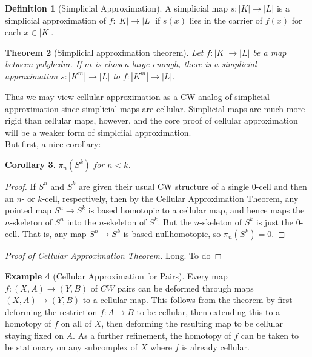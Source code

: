 \documentclass[reqno]{amsart}
\newtheorem{theorem}{Theorem}[section]
\newtheorem{corollary}[theorem]{Corollary}
\theoremstyle{definition}
\newtheorem{definition}[theorem]{Definition}
\newtheorem{example}[theorem]{Example}
\theoremstyle{remark}
\begin{document}
\begin{definition}[Simplicial Approximation]
    A simplicial map $s \colon \left| K \right| 
    \to \left| L \right| $ is a simplicial approximation of 
    $f \colon \left| K \right|  \to \left| L \right| $ 
    if $s(x)$ lies in the carrier of $f(x)$ for
    each $x \in \left| K \right| $.
\end{definition}

\begin{theorem}[Simplicial approximation theorem]
    Let $f \colon \left| K \right| \to 
    \left| L \right| $ be a map between polyhedra.
    If $m$ is chosen large enough, there is a simplicial
    approximation $s \colon \left| K^{m} \right| \to 
    \left| L \right| $ to $f \colon \left| K^{m} \right| 
    \to \left| L \right| $.
\end{theorem}

Thus we may view cellular approximation as
a CW analog of simplicial approximation since simplicial
maps are cellular. Simplicial maps are much more rigid
than cellular maps, however, and the core
proof of cellular approximation will be
a weaker form of simplciial approximation.\\
\linebreak
But first, a nice corollary:

\begin{corollary}
    $\pi_n \left( S^{k} \right) $ for
    $n<k$.
\end{corollary}

\begin{proof}
    If $S^{n}$ and $S^{k}$ are given their usual
    CW structure of a single $0$-cell and
    then an $n$- or $k$-cell, respectively, then by
    the Cellular Approximation Theorem, 
    any pointed map $S^{n} \to S^{k}$ is based homotopic to a 
    cellular map, and hence maps
    the  $n$-skeleton of $S^{n}$ into the $n$-skeleton
    of $S^{k}$. But the $n$-skeleton of $S^{k}$ is
    just the $0$-cell. That is, 
    any map $S^{n} \to S^{k}$ is based nullhomotopic, so
    $\pi_n \left( S^{k} \right) = 0$.
\end{proof}

\begin{proof}[Proof of Cellular Approximation Theorem]
    Long. To do
\end{proof}

\begin{example}[Cellular Approximation for Pairs]
    Every map $f \colon \left( X,A \right) 
    \to \left( Y,B \right) $ of $CW$ pairs can be deformed
    through maps $\left( X,A \right) \to 
    \left( Y,B \right) $ to a cellular map.
    This follows from the theorem by first deforming the
    restriction $f \colon A\to B$ to be cellular,
    then extending this to a homotopy of $f$ on all
    of $X$, then deforming the resulting map
    to be cellular staying fixed on $A$. As a further
    refinement, the homotopy of $f$ can be
    taken to be stationary on any subcomplex of
    $X$ where $f$ is already cellular.
\end{example}
\end{document}
